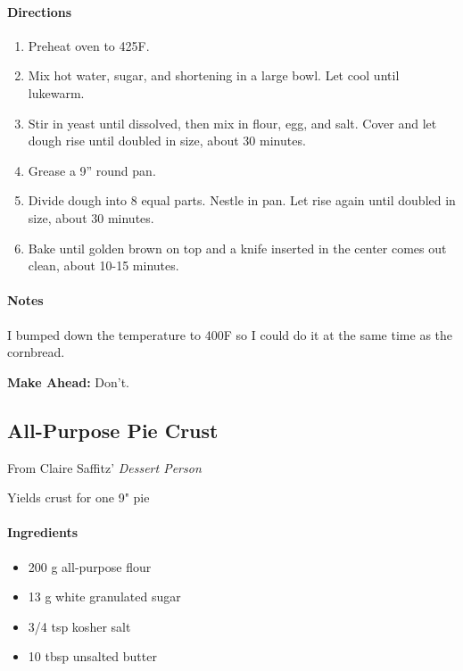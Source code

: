 \documentclass[12pt]{article}
\newenvironment*{ingredients}
	{
		\paragraph*{Ingredients}
		\begin{itemize}
	}
	{
		\end{itemize}
	}
\newenvironment*{directions}
	{
		\paragraph*{Directions}
		\begin{enumerate}
	}
	{
		\end{enumerate}
	}
\newenvironment*{notes}
	{
		\paragraph*{Notes}
		\begin{adjustwidth}{1cm}{}
	}
	{
		\end{adjustwidth}
	}
\begin{document}
	\begin{directions}
		\item Preheat oven to 425F.
		\item Mix hot water, sugar, and shortening in a large bowl. Let cool until lukewarm.
		\item Stir in yeast until dissolved, then mix in flour, egg, and salt. Cover and let dough rise until doubled in size, about 30 minutes.
		\item Grease a 9” round pan.
		\item Divide dough into 8 equal parts. Nestle in pan. Let rise again until doubled in size, about 30 minutes.
		\item Bake until golden brown on top and a knife inserted in the center comes out clean, about 10-15 minutes.
	\end{directions}
	
	\begin{notes}
		I bumped down the temperature to 400F so I could do it at the same time as the cornbread.
		
		\textbf{Make Ahead:} Don't.
	\end{notes}
	
	\newpage
	
	\subsection{All-Purpose Pie Crust}\label{sec:pie_crust}
	From Claire Saffitz' \textit{Dessert Person}
	
	Yields crust for one 9" pie
	
	\begin{ingredients}
		\item 200 g all-purpose flour
		\item 13 g white granulated sugar
		\item 3/4 tsp kosher salt
		\item 10 tbsp unsalted butter
	\end{ingredients}
	
\end{document}
